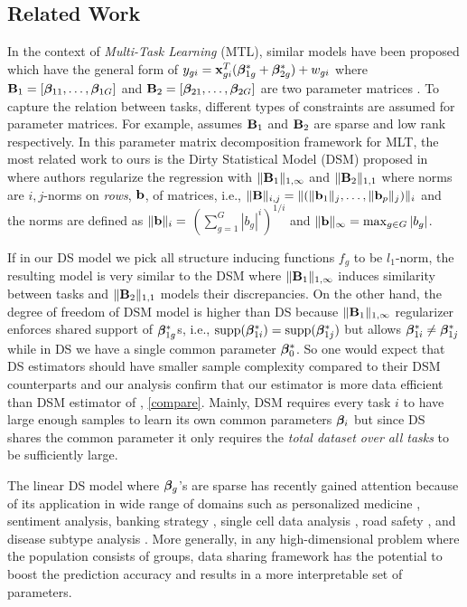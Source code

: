 \subsection{Related Work}
In the context of \emph{Multi-Task Learning} (MTL), similar models have been proposed which have the general form of $y_{gi} = \mathbf{x}_{gi}^T (\boldsymbol{\beta}_{1g}^* + \boldsymbol{\beta}^*_{2g}) + w_{gi}$ where $\mathbf{B}_1 = [\boldsymbol{\beta}_{11}, \dots, \boldsymbol{\beta}_{1G}]$ and $\mathbf{B}_2 = [\boldsymbol{\beta}_{21}, \dots, \boldsymbol{\beta}_{2G}]$ are two parameter matrices \cite{Zhang2017-rm}. To capture the relation between tasks, different types of constraints are assumed for parameter matrices. For example, \cite{Chen2012-fb} assumes $\mathbf{B}_1$ and $\mathbf{B}_2$ are sparse and low rank respectively. In this parameter matrix decomposition framework for MLT, the most related work to ours is the Dirty Statistical Model (DSM) proposed in \cite{jrsr10} where authors regularize the regression with $\|\mathbf{B}_1\|_{1, \infty}$ and $\|\mathbf{B}_2\|_{1,1}$ where norms are $i, j$-norms on \emph{rows}, $\mathbf{b}$, of matrices, i.e., $\|\mathbf{B}\|_{i,j} = \|(\|\mathbf{b}_1\|_{j}, \dots, \|\mathbf{b}_p\|_{j})\|_{i}$ and the norms are defined as $\|\mathbf{b}\|_{i} =$ {\small$\left(\sum_{g=1}^{G}|b_g|^i\right)^{1/i}$} and $\|\mathbf{b}\|_{\infty} = \max_{g\in G} |b_g|$. 

If in our DS model we pick all structure inducing functions $f_g$ to be $l_1$-norm, the resulting model is very similar to the DSM where $\|\mathbf{B}_1\|_{1, \infty}$ induces similarity between tasks and $\|\mathbf{B}_2\|_{1,1}$ models their discrepancies. On the other hand, the degree of freedom of DSM model is higher than DS because $\|\mathbf{B}_1\|_{1, \infty}$ regularizer enforces shared support of $\boldsymbol{\beta}^*_{1g}$s, i.e., $\text{supp}(\boldsymbol{\beta}_{1i}^*) = \text{supp}(\boldsymbol{\beta}_{1j}^*)$ but allows $\boldsymbol{\beta}_{1i}^* \neq \boldsymbol{\beta}_{1j}^*$ while in DS we have a single common parameter $\boldsymbol{\beta}_0^*$. So one would expect that DS estimators should have smaller sample complexity compared to their DSM counterparts and our analysis confirm that our estimator is more data efficient than DSM estimator of \cite{jrsr10}, \cref{compare}. Mainly, DSM requires every task $i$ to have large enough samples to learn its own common parameters $\boldsymbol{\beta}_i$ but since DS shares the common parameter it only requires the {\em{total dataset over all tasks}} to be sufficiently large.

The linear DS model where $\boldsymbol{\beta}_g$'s are sparse has recently gained attention because of its application in wide range of domains such as personalized medicine \cite{domu16}, sentiment analysis, banking strategy \cite{grti16}, single cell data analysis \cite{olvi15}, road safety \cite{olvi14}, and disease subtype analysis \cite{domu16}.
More generally, in any high-dimensional problem where the population consists of groups, data sharing framework has the potential to boost the prediction accuracy and results in a more interpretable set of parameters.

